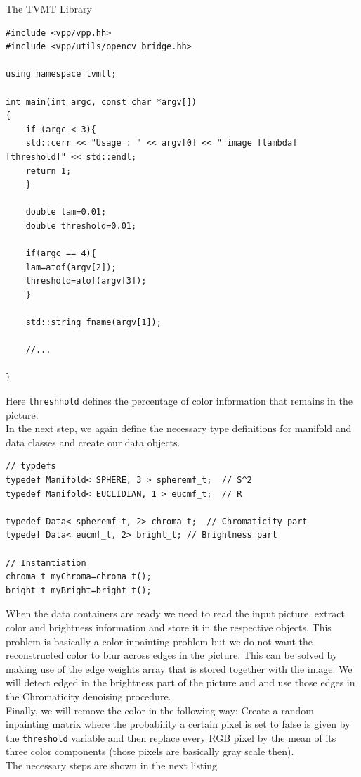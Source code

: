 \begin{chapter}{The TVMT Library}
\begin{lstlisting}[label=code:tut2_init,caption={Include library files and read parameters from standard input}]
#include <vpp/vpp.hh>
#include <vpp/utils/opencv_bridge.hh>

using namespace tvmtl;

int main(int argc, const char *argv[])
{
    if (argc < 3){
	std::cerr << "Usage : " << argv[0] << " image [lambda] [threshold]" << std::endl;
	return 1;
    }

    double lam=0.01;
    double threshold=0.01;

    if(argc == 4){
	lam=atof(argv[2]);
	threshold=atof(argv[3]);
    }   

    std::string fname(argv[1]);

    //...

}
\end{lstlisting}
Here \texttt{threshhold} defines the percentage of color information that remains in the picture.\\
In the next step, we again define the necessary type definitions for manifold and data classes and create our data objects.

\cppinline
\begin{lstlisting}[label=code:tut2_mfdata,caption={Manifold and Data class type definitions and instantiation}]
// typdefs
typedef Manifold< SPHERE, 3 > spheremf_t;  // S^2
typedef Manifold< EUCLIDIAN, 1 > eucmf_t;  // R
 
typedef Data< spheremf_t, 2> chroma_t;	// Chromaticity part
typedef Data< eucmf_t, 2> bright_t;	// Brightness part

// Instantiation
chroma_t myChroma=chroma_t();
bright_t myBright=bright_t();
\end{lstlisting}

When the data containers are ready we need to read the input picture, extract color and brightness information and store it in the respective objects.
This problem is basically a color inpainting problem but we do not want the reconstructed color to blur across edges in the picture. This can be solved
by making use of the edge weights array that is stored together with the image. We will detect edged in the brightness part of the picture and and
use those edges in the Chromaticity denoising procedure.\\
Finally, we will remove the color in the following way: Create a random inpainting matrix where the probability a certain pixel is set to false is given
by the \texttt{threshold} variable and then replace every RGB pixel by the mean of its three color components (those pixels are basically gray scale then).\\
The necessary steps are shown in the next listing


\end{chapter}
